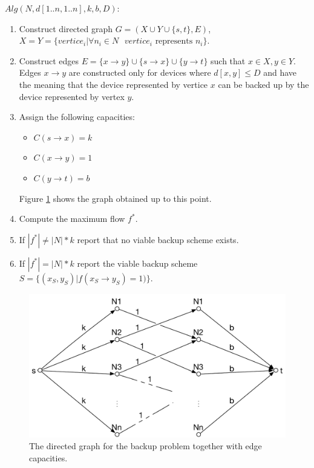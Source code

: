 $Alg(N, d[1..n, 1..n], k, b, D):$
\begin{enumerate}

	\item Construct directed graph $G=(X \cup Y \cup \{s, t\}, E)$, $ X=Y=\{ vertice_i | \forall{n_i \in N \text{ $vertice_i$ represents $n_i$}}\}$.
	
	\item Construct edges $E = \{ x \rightarrow y \} \cup \{ s \rightarrow x \} \cup \{ y \rightarrow t \}$ such that $x \in X, y \in Y$. Edges  $x \rightarrow y$ are constructed only for devices where $d[x, y] \leq D$ and have the meaning that the device represented by vertice $x$ can be backed up by the device represented by vertex $y$.
	
	\item Assign the following capacities:
	\begin{itemize}
	
		\item $C(s \rightarrow x) = k$
		
		\item $C(x \rightarrow y) = 1$
		
		\item $C(y \rightarrow t) = b$
	
	\end{itemize}
	
	Figure \ref{fig:graph} shows the graph obtained up to this point.
	
	\item Compute the maximum flow $f^*$.
	
	\item If $|f^*| \neq |N| * k$ report that no viable backup scheme exists.
	
	\item If ${|f^*| = |N| * k}$ report the viable backup scheme ${S = \{ (x_S, y_S) | f(x_S \rightarrow y_S) = 1) \}}$.

\end{enumerate}

\begin{figure}[h!]
	\centering
		\includegraphics[width=\textwidth]{graph}
    
	\caption{The directed graph for the backup problem together with edge capacities.}
	\label{fig:graph}
\end{figure}






